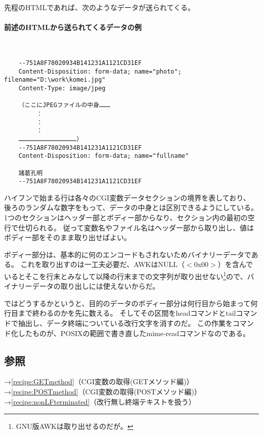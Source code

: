 先程のHTMLであれば、次のようなデータが送られてくる。

\paragraph{前述のHTMLから送られてくるデータの例} 　\\
\begin{frameboxit}{160.0mm}
\begin{verbatim}
	--751A8F78020934B141231A1121CD31EF
	Content-Disposition: form-data; name="photo"; filename="D:\work\komei.jpg"
	Content-Type: image/jpeg

	（ここにJPEGファイルの中身………
	　　　：
	　　　：
	　　　：
	…………………………………………）
	--751A8F78020934B141231A1121CD31EF
	Content-Disposition: form-data; name="fullname"

	諸葛孔明
	--751A8F78020934B141231A1121CD31EF
\end{verbatim}
\end{frameboxit}

ハイフンで始まる行は各々のCGI変数データセクションの境界を表しており、
後ろのランダムな数字をもって、データの中身とは区別できるようにしている。
1つのセクションはヘッダー部とボディー部からなり、セクション内の最初の空行で仕切られる。
従って変数名やファイル名はヘッダー部から取り出し、値はボディー部をそのまま取り出せばよい。

ボディー部分は、基本的に何のエンコードもされないためバイナリーデータである。
これを取り出すのは一工夫必要だ、AWKはNULL（$<$0x00$>$）を含んでいるとそこを行末とみなして以降の行末までの文字列が取り出せない\footnote{GNU版AWKは取り出せるのだが。}ので、バイナリーデータの取り出しには使えないからだ。

ではどうするかというと、目的のデータのボディー部分は何行目から始まって何行目まで終わるのかを先に数える。
そしてその区間をheadコマンドとtailコマンドで抽出し、データ終端についている改行文字を消すのだ。
この作業をコマンド化したものが、POSIXの範囲で書き直したmime-readコマンドなのである。

\subsection*{参照}

\noindent
→\ref{recipe:GETmethod}（CGI変数の取得(GETメソッド編)） \\
→\ref{recipe:POSTmethod}（CGI変数の取得(POSTメソッド編)） \\
→\ref{recipe:nonLFterminated}（改行無し終端テキストを扱う）
